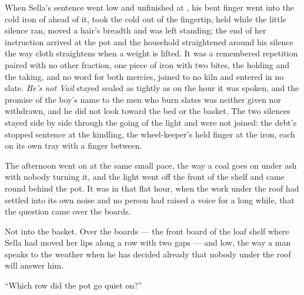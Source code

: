 When Sella's sentence went low and unfinished at , his bent finger went into the cold iron of  ahead of it, took the cold out of the fingertip, held while the little silence ran, moved a hair's breadth and was left standing; the end of her instruction arrived at the pot and the household straightened around his silence the way cloth straightens when a weight is lifted. It was a remembered repetition paired with no other fraction, one piece of iron with two bites, the holding and the taking, and no  word for both mercies, joined to no kiln and entered in no slate. \emph{He’s not Vail} stayed sealed as tightly as on the hour it was spoken, and the promise of the boy's name to the men who burn slates was neither given nor withdrawn, and he did not look toward the bed or the basket. The two silences stayed side by side through the going of the light and were not joined: the debt's stopped sentence at the kindling, the wheel-keeper's held finger at the iron, each on its own tray with a finger between.

\scenebreak

The afternoon went on at the same small pace, the way a coal goes on under ash with nobody turning it, and the light went off the front of the shelf and came round behind the pot. It was in that flat hour, when the work under the roof had settled into its own noise and no person had raised a voice for a long while, that the question came over the boards.

Not into the basket. Over the boards --- the front board of the loaf shelf where Sella had moved her lips along a row with two gaps --- and low, the way a man speaks to the weather when he has decided already that nobody under the roof will answer him.

“Which row did the pot go quiet on?”

